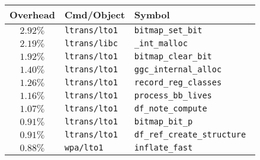 \begin{tabular}{|c|l|l|}\hline Overhead & Cmd/Object & Symbol \\  \hline
\hline$2.92\%$ & \tt ltrans\hfill/lto1 & \tt bitmap\_set\_bit \\
\hline $2.19\%$ & \tt ltrans\hfill/libc & \tt \_int\_malloc \\
\hline $1.92\%$ & \tt ltrans\hfill/lto1 & \tt bitmap\_clear\_bit \\
\hline $1.40\%$ & \tt ltrans\hfill/lto1 & \tt ggc\_internal\_alloc \\
\hline $1.26\%$ & \tt ltrans\hfill/lto1 & \tt record\_reg\_classes \\
\hline $1.16\%$ & \tt ltrans\hfill/lto1 & \tt process\_bb\_lives \\
\hline $1.07\%$ & \tt ltrans\hfill/lto1 & \tt df\_note\_compute \\
\hline $0.91\%$ & \tt ltrans\hfill/lto1 & \tt bitmap\_bit\_p \\
\hline $0.91\%$ & \tt ltrans\hfill/lto1 & \tt df\_ref\_create\_structure \\
\hline $0.88\%$ & \tt wpa\hfill/lto1 & \tt inflate\_fast \\
\hline \end{tabular}
